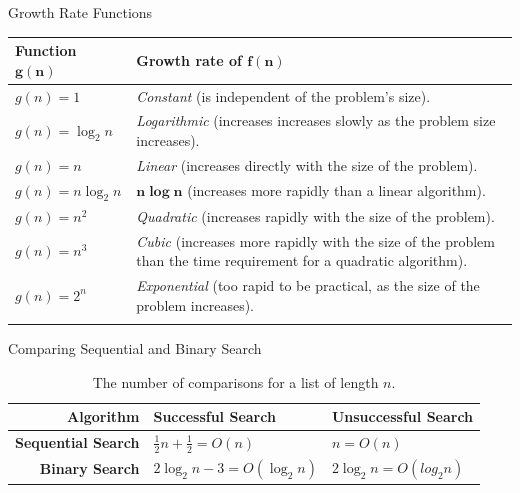 \documentclass[14pt,aspectratio=1610]{beamer}
\begin{document}
\begin{frame}{Growth Rate Functions}
\small
\begin{tabularx}{1\textwidth}{l X}
  \toprule{}
  \textbf{Function \(\boldsymbol{g(n)}\)} & \textbf{Growth rate of \(\boldsymbol{f(n)}\)}\\
  \midrule%
  \(g(n) = 1\)        & \emph{Constant} (is independent of the problem's size).\\
  \(g(n) = \log_2n\)  & \emph{Logarithmic} (increases increases slowly
                  as the problem size increases).\\
  \(g(n) = n\)        & \emph{Linear} (increases directly with the size
                  of the problem).\\
  \(g(n) = n \log_2n\) & \(\boldsymbol{n\log{n}}\) (increases more rapidly than a linear algorithm).\\
  \(g(n) = n^2\)      & \emph{Quadratic} (increases rapidly with the
                  size of the problem).\\
  \(g(n) = n^3\)      & \emph{Cubic} (increases more rapidly with the
                  size of the problem than the time requirement for a quadratic algorithm).\\
  \(g(n) = 2^n\)     & \emph{Exponential} (too rapid to be practical, as the size of the problem increases).\\
  \bottomrule{}
\end{tabularx}
\end{frame}

\begin{frame}{Comparing Sequential and Binary Search}

\begin{table}[]
\small
\begin{tabular}{r l l}
\toprule%
\textbf{Algorithm} & \textbf{Successful Search} & \textbf{Unsuccessful Search}\\%
\midrule
\textbf{Sequential Search} & \(\frac{1}{2}n + \frac{1}{2} = O(n)\) & \(n = O(n)\)\\[1.5ex]
\textbf{Binary Search} & \(2\log_2n - 3 = O(\log_2n)\) & \(2\log_2n = O(log_2{n})\)\\%
\bottomrule
\end{tabular}
\caption{The number of comparisons for a list of length \(n\).}
\end{table}
\end{frame}
\end{document}
